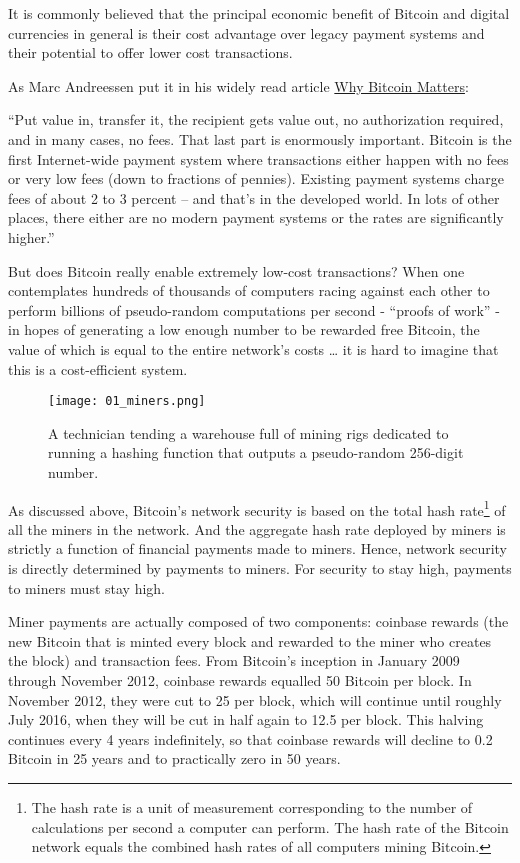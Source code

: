 \documentclass[a4paper,11pt]{article}
\begin{document}
It is commonly believed that the principal economic benefit of Bitcoin and digital currencies in general is their cost advantage over legacy payment systems and their potential to offer lower cost transactions.

As Marc Andreessen put it in his widely read article \href{http://dealbook.nytimes.com/2014/01/21/why-Bitcoin-matters/}{Why Bitcoin Matters}: 

``Put value in, transfer it, the recipient gets value out, no authorization required, and in many cases, no fees. That last part is enormously important. Bitcoin is the first Internet-wide payment system where transactions either happen with no fees or very low fees (down to fractions of pennies). Existing payment systems charge fees of about 2 to 3 percent – and that's in the developed world. In lots of other places, there either are no modern payment systems or the rates are significantly higher.''

But does Bitcoin really enable extremely low-cost transactions? When one contemplates hundreds of thousands of computers racing against each other to perform billions of pseudo-random computations per second - ``proofs of work'' - in hopes of generating a low enough number to be rewarded free Bitcoin, the value of which is equal to the entire network's costs … it is hard to imagine that this is a cost-efficient system.


\begin{figure}[H]
\centering
\texttt{[image: 01\_miners.png]}
\caption{A technician tending a warehouse full of mining rigs dedicated to 
running a hashing function that outputs a pseudo-random 256-digit number.}
\end{figure}

As discussed above, Bitcoin's network security is based on the total hash rate\footnote{The hash rate is a unit of measurement corresponding to the number of calculations per second a computer can perform. The hash rate of the Bitcoin network equals the combined hash rates of all computers mining Bitcoin.} of all the miners in the network. And the aggregate hash rate deployed by miners is strictly a function of financial payments made to miners. Hence, network security is directly determined by payments to miners. For security to stay high, payments to miners must stay high.


Miner payments are actually composed of two components: coinbase rewards (the new Bitcoin that is minted every block and rewarded to the miner who creates the block) and transaction fees. From Bitcoin's inception in January 2009 through November 2012, coinbase rewards equalled 50 Bitcoin per block. In November 2012, they were cut to 25 per block, which will continue until roughly July 2016, when they will be cut in half again to 12.5 per block. This halving continues every 4 years indefinitely, so that coinbase rewards will decline to 0.2 Bitcoin in 25 years and to practically zero in 50 years.
\end{document}
